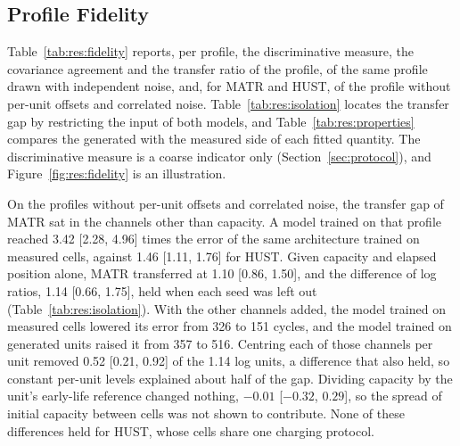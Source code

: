 \documentclass{article}
\begin{document}
\subsection{Profile Fidelity}
\label{sec:res:fidelity}

Table~\ref{tab:res:fidelity} reports, per profile, the discriminative measure, the covariance agreement and the transfer ratio of the profile, of the same profile drawn with independent noise, and, for MATR and HUST, of the profile without per-unit offsets and correlated noise. Table~\ref{tab:res:isolation} locates the transfer gap by restricting the input of both models, and Table~\ref{tab:res:properties} compares the generated with the measured side of each fitted quantity. The discriminative measure is a coarse indicator only (Section~\ref{sec:protocol}), and Figure~\ref{fig:res:fidelity} is an illustration.

On the profiles without per-unit offsets and correlated noise, the transfer gap of MATR sat in the channels other than capacity. A model trained on that profile reached 3.42 [2.28, 4.96] times the error of the same architecture trained on measured cells, against 1.46 [1.11, 1.76] for HUST. Given capacity and elapsed position alone, MATR transferred at 1.10 [0.86, 1.50], and the difference of log ratios, 1.14 [0.66, 1.75], held when each seed was left out (Table~\ref{tab:res:isolation}). With the other channels added, the model trained on measured cells lowered its error from 326 to 151 cycles, and the model trained on generated units raised it from 357 to 516. Centring each of those channels per unit removed 0.52 [0.21, 0.92] of the 1.14 log units, a difference that also held, so constant per-unit levels explained about half of the gap. Dividing capacity by the unit's early-life reference changed nothing, $-0.01$ [$-0.32$, $0.29$], so the spread of initial capacity between cells was not shown to contribute. None of these differences held for HUST, whose cells share one charging protocol.
\end{document}
